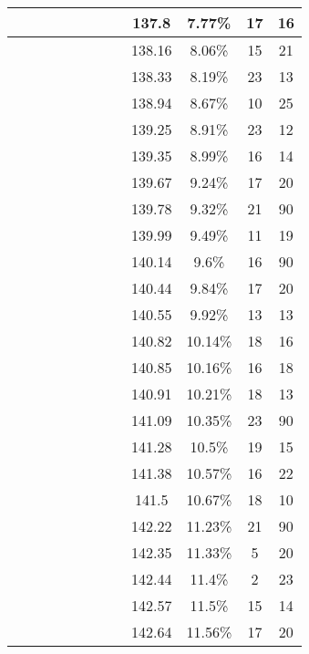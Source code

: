 \begin{center}
\begin{longtable}{|c|c|c|c|c|c|c|c|c|c|c|c|}
 \x &  &  &  \x &  \x &  \x &  &  \x & 137.8 & 7.77\% & 17 & 16 \\ \hline
 \x &  \x &  &  &  \x &  \x &  &  & 138.16 & 8.06\% & 15 & 21 \\ \hline
 \x &  &  \x &  &  &  &  &  & 138.33 & 8.19\% & 23 & 13 \\ \hline
 \x &  \x &  &  \x &  &  \x &  &  & 138.94 & 8.67\% & 10 & 25 \\ \hline
 \x &  \x &  &  &  &  &  &  \x & 139.25 & 8.91\% & 23 & 12 \\ \hline
 \x &  \x &  &  &  &  \x &  &  & 139.35 & 8.99\% & 16 & 14 \\ \hline
 \x &  \x &  \x &  &  &  &  &  & 139.67 & 9.24\% & 17 & 20 \\ \hline
 \x &  &  \x &  &  \x &  \x &  &  \x & 139.78 & 9.32\% & 21 & 90 \\ \hline
 \x &  \x &  \x &  \x &  &  &  &  & 139.99 & 9.49\% & 11 & 19 \\ \hline
 \x &  &  &  &  &  &  &  \x & 140.14 & 9.6\% & 16 & 90 \\ \hline
 \x &  &  &  &  \x &  &  &  \x & 140.44 & 9.84\% & 17 & 20 \\ \hline
 \x &  &  &  \x &  &  \x &  &  & 140.55 & 9.92\% & 13 & 13 \\ \hline
 \x &  &  \x &  &  &  \x &  &  & 140.82 & 10.14\% & 18 & 16 \\ \hline
 \x &  \x &  \x &  &  &  &  &  \x & 140.85 & 10.16\% & 16 & 18 \\ \hline
 \x &  \x &  \x &  \x &  &  \x &  &  \x & 140.91 & 10.21\% & 18 & 13 \\ \hline
 \x &  \x &  &  &  &  &  &  & 141.09 & 10.35\% & 23 & 90 \\ \hline
 \x &  &  \x &  &  &  &  &  \x & 141.28 & 10.5\% & 19 & 15 \\ \hline
 \x &  &  \x &  &  \x &  &  &  \x & 141.38 & 10.57\% & 16 & 22 \\ \hline
 \x &  &  &  &  \x &  &  &  & 141.5 & 10.67\% & 18 & 10 \\ \hline
 \x &  &  &  &  \x &  \x &  &  & 142.22 & 11.23\% & 21 & 90 \\ \hline
 \x &  \x &  \x &  \x &  &  \x &  \x &  \x & 142.35 & 11.33\% & 5 & 20 \\ \hline
 \x &  \x &  &  \x &  \x &  &  &  \x & 142.44 & 11.4\% & 2 & 23 \\ \hline
 \x &  \x &  \x &  &  &  \x &  \x &  \x & 142.57 & 11.5\% & 15 & 14 \\ \hline
 \x &  \x &  &  \x &  &  \x &  &  \x & 142.64 & 11.56\% & 17 & 20 \\ \hline

\end{longtable}
\end{center}
